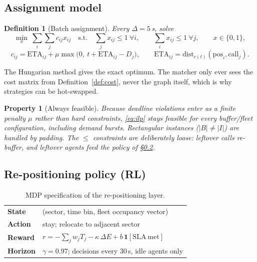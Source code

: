\documentclass[11pt,a4paper]{article}
\theoremstyle{spaceddef}
\newtheorem{definition}{Definition}[section]
\theoremstyle{spacedplain}
\newtheorem{property}{Property}[section]
\begin{document}
\subsection{Assignment model}\label{sec:assign}
\begin{definition}[Batch assignment]\label{def:assign}
Every $\Delta=5$\,s, solve
\begin{equation}\label{eq:ilp}
\min_{x}\ \sum_{i}\sum_{j} c_{ij}x_{ij}\quad\text{s.t.}\quad
\sum_j x_{ij}\le1\ \forall i,\qquad \sum_i x_{ij}\le1\ \forall j,\qquad x\in\{0,1\},
\end{equation}
\begin{equation}\label{eq:costij}
c_{ij}=\mathrm{ETA}_{ij}+\mu\max\bigl(0,\ t+\mathrm{ETA}_{ij}-D_j\bigr),\qquad
\mathrm{ETA}_{ij}=\mathrm{dist}_{c(t)}(\mathrm{pos}_i,\mathrm{call}_j).
\end{equation}
\end{definition}
The Hungarian method \cite{kuhn1955} gives the exact optimum. The matcher only
ever sees the cost matrix from Definition~\ref{def:cost}, never the graph itself,
which is why strategies can be hot-swapped.

\begin{property}[Always feasible]\label{prop:feasible}
Because deadline violations enter as a finite penalty $\mu$ rather than hard
constraints, \eqref{eq:ilp} stays feasible for every buffer/fleet configuration,
including demand bursts. Rectangular instances ($|B|\ne|I|$) are handled by
padding. The $\le$ constraints are deliberately loose: leftover calls re-buffer,
and leftover agents feed the policy of \S\ref{sec:rl}.
\end{property}

\subsection{Re-positioning policy (RL)}\label{sec:rl}
\begin{table}[H]\centering\small
\begin{tabular}{@{}>{\sffamily\bfseries}lp{10cm}@{}}
\toprule
State & (sector, time bin, fleet occupancy vector) \\
Action & stay; relocate to adjacent sector \\
Reward & $r=-\sum_j w_jT_j-\kappa\,\Delta E+b\,\mathbf{1}[\mathrm{SLA\ met}]$ \\
Horizon & $\gamma=0.97$; decisions every 30\,s, idle agents only \\
\bottomrule
\end{tabular}
\caption{MDP specification of the re-positioning layer.}
\end{table}
\end{document}
